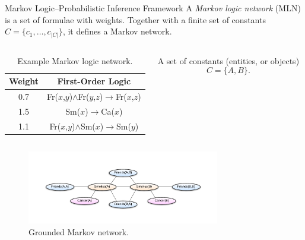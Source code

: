 \documentclass[onlymath,xcolor=pdftex,dvipsnames,table]{beamer}
\let\oldemph\emph
\renewcommand{\emph}[1]{{\color{Blue}\oldemph{#1}}}
\begin{document}
\begin{frame}{Markov Logic--Probabilistic Inference Framework}
A \emph{Markov logic network} (MLN) is a set of formulae with
weights. Together with a finite set of constants
$C=\{c_1,\ldots,c_{\left\vert C\right\vert}\}$, it defines a Markov
network.

\begin{columns}[c]
  \begin{table}\tiny
    \centering
    \begin{tabular}{cc}\toprule
      \textbf{Weight} & \textbf{First-Order Logic}\\\midrule
      0.7 & Fr($x$,$y$)$\wedge$Fr($y$,$z$)$\rightarrow$Fr($x$,$z$)\\
      1.5 & Sm($x$)$\rightarrow$Ca($x$)\\
      1.1 & Fr($x$,$y$)$\wedge$Sm($x$)$\rightarrow$Sm($y$)\\
      \bottomrule
    \end{tabular}
    \caption{Example Markov logic network.}
    \label{tab:mln}
  \end{table}

  A set of constants (entities, or objects) $$C=\{A,B\}.$$
\end{columns}\vspace{-25pt}
\begin{figure}
  \centering
  \includegraphics[clip,trim=40 35 40 40,width=0.75\textwidth]{mrf.pdf}
  \caption{Grounded Markov network.}
  \label{fig:ground}
\end{figure}
\end{frame}


\end{document}
